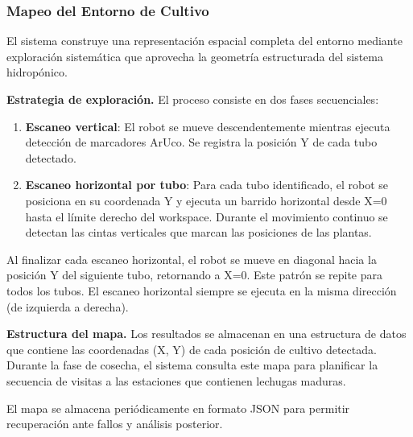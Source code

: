 \subsubsection{Mapeo del Entorno de Cultivo}

El sistema construye una representación espacial completa del entorno mediante exploración sistemática que aprovecha la geometría estructurada del sistema hidropónico.

\textbf{Estrategia de exploración.} El proceso consiste en dos fases secuenciales:

\begin{enumerate}
    \item \textbf{Escaneo vertical}: El robot se mueve descendentemente mientras ejecuta detección de marcadores ArUco. Se registra la posición Y de cada tubo detectado.

    \item \textbf{Escaneo horizontal por tubo}: Para cada tubo identificado, el robot se posiciona en su coordenada Y y ejecuta un barrido horizontal desde X=0 hasta el límite derecho del workspace. Durante el movimiento continuo se detectan las cintas verticales que marcan las posiciones de las plantas.
\end{enumerate}

Al finalizar cada escaneo horizontal, el robot se mueve en diagonal hacia la posición Y del siguiente tubo, retornando a X=0. Este patrón se repite para todos los tubos. El escaneo horizontal siempre se ejecuta en la misma dirección (de izquierda a derecha).

\textbf{Estructura del mapa.} Los resultados se almacenan en una estructura de datos que contiene las coordenadas (X, Y) de cada posición de cultivo detectada. Durante la fase de cosecha, el sistema consulta este mapa para planificar la secuencia de visitas a las estaciones que contienen lechugas maduras.

El mapa se almacena periódicamente en formato JSON para permitir recuperación ante fallos y análisis posterior.
